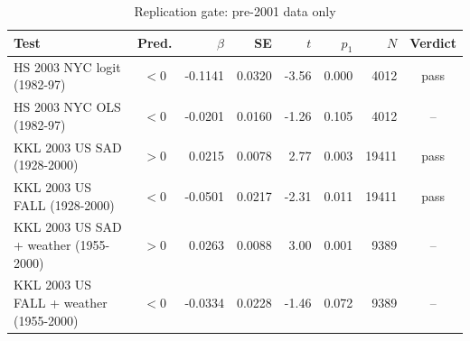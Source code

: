 \begin{table}[htbp]\centering\small
\caption{Replication gate: pre-2001 data only}
\begin{tabular}{lcrrrrrc}\toprule
Test & Pred. & $\beta$ & SE & $t$ & $p_{1}$ & $N$ & Verdict \\ \midrule
HS 2003 NYC logit (1982-97) & $<$0 & -0.1141 & 0.0320 & -3.56 & 0.000 & 4012 & pass \\
HS 2003 NYC OLS (1982-97) & $<$0 & -0.0201 & 0.0160 & -1.26 & 0.105 & 4012 & -- \\
KKL 2003 US SAD (1928-2000) & $>$0 & 0.0215 & 0.0078 & 2.77 & 0.003 & 19411 & pass \\
KKL 2003 US FALL (1928-2000) & $<$0 & -0.0501 & 0.0217 & -2.31 & 0.011 & 19411 & pass \\
KKL 2003 US SAD + weather (1955-2000) & $>$0 & 0.0263 & 0.0088 & 3.00 & 0.001 & 9389 & -- \\
KKL 2003 US FALL + weather (1955-2000) & $<$0 & -0.0334 & 0.0228 & -1.46 & 0.072 & 9389 & -- \\
\bottomrule\end{tabular}\end{table}

